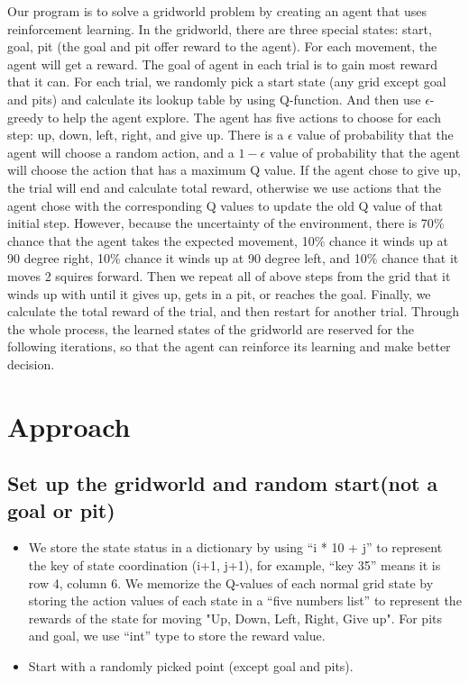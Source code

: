 \documentclass[11pt, a4paper]{article}
\begin{document}
Our program is to solve a gridworld problem by creating an agent that uses reinforcement learning. In the gridworld, there are three special states: start, goal, pit (the goal and pit offer reward to the agent). For each movement, the agent will get a reward. The goal of agent in each trial is to gain most reward that it can. For each trial, we randomly pick a start state (any grid except goal and pits) and calculate its lookup table by using Q-function. And then use $\epsilon$-greedy to help the agent explore. The agent has five actions to choose for each step: up, down, left, right, and give up. There is a $\epsilon$ value of probability that the agent will choose a random action, and a $1-\epsilon$ value of probability that the agent will choose the action that has a maximum Q value. If the agent chose to give up, the trial will end and calculate total reward, otherwise we use actions that the agent chose with the corresponding Q values to update the old Q value of that initial step. However, because the uncertainty of the environment, there is 70$\%$ chance that the agent takes the expected movement, 10$\%$ chance it winds up at 90 degree right, 10$\%$ chance it winds up at 90 degree left, and 10$\%$ chance that it moves 2 squires forward. Then we repeat all of above steps from the grid that it winds up with until it gives up, gets in a pit, or reaches the goal. Finally, we calculate the total reward of the trial, and then restart for another trial. Through the whole process, the learned states of the gridworld are reserved for the following iterations, so that the agent can reinforce its learning and make better decision.


\section{Approach}

\subsection{Set up the gridworld and random start(not a goal or pit)}

\begin{itemize}
\item We store the state status in a dictionary by using “i * 10 + j” to represent the key of state coordination (i+1, j+1), for example, “key 35” means it is row 4, column 6. We memorize the Q-values of each normal grid state by storing the action values of each state in a “five numbers list” to represent the rewards of the state for moving "Up, Down, Left, Right, Give up". For pits and goal, we use “int” type to store the reward value.

\item Start with a randomly picked point (except goal and pits).

\end{itemize}
\end{document}
